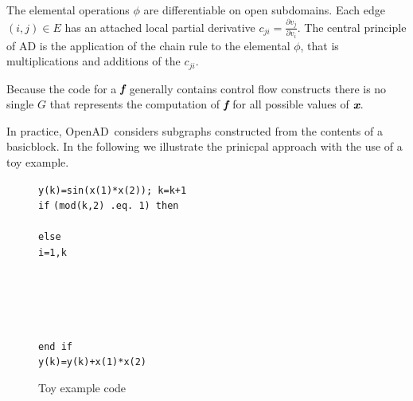 \documentclass[acmtocl,acmnow]{acmtrans2m}
\newcommand{\basicblock}{basicblock}
\newcommand{\OpenAD}{OpenAD}
\newcommand{\bmf}{\mbox{\bf\em f}}
\newcommand{\bmx}{\mbox{\bf\em x}}
\begin{document}
The elemental operations $\phi$ are differentiable on open subdomains. 
Each edge $(i,j)\in E$ has an attached local partial derivative 
$c_{ji}=\frac{\partial v_j}{\partial v_i}$. 
The central principle of AD is 
the application of the chain rule to the elemental $\phi$, that is 
multiplications and additions of the  $c_{ji}$.  

Because the code for a $\bmf$ generally contains control flow constructs there is no 
single $G$ that represents the computation of $\bmf$ for all possible values of $\bmx$.

In practice, \OpenAD\ considers subgraphs constructed 
from the contents of a \basicblock.
In the following we illustrate the prinicpal approach with the use 
of a toy example.  
\begin{figure}
\begin{tabbing}
\hspace{.6cm}{\footnotesize \bf 01}\hspace{.5cm} {\tt y(k)=sin(x(1)*x(2)); k=k+1} \\
\hspace{.6cm}{\footnotesize \bf 02}\hspace{.5cm} {\tt if} \={\tt (mod(k,2) .eq. 1) then } \\
\hspace{.6cm}{\footnotesize \bf 03}\hspace{.5cm}   \\
\hspace{.6cm}{\footnotesize \bf 04}\hspace{.5cm} {\tt else } \\
\hspace{.6cm}{\footnotesize \bf 05}\hspace{.5cm}  \={\tt i=1,k } \\
\hspace{.6cm}{\footnotesize \bf 06}\hspace{.5cm} \> \\
\hspace{.6cm}{\footnotesize \bf 07}\hspace{.5cm} \> \\
\hspace{.6cm}{\footnotesize \bf 08}\hspace{.5cm} \> \\
\hspace{.6cm}{\footnotesize \bf 09}\hspace{.5cm} \> \\
\hspace{.6cm}{\footnotesize \bf 10}\hspace{.5cm}  \\
\hspace{.6cm}{\footnotesize \bf 11}\hspace{.5cm} {\tt end if } \\
\hspace{.6cm}{\footnotesize \bf 12}\hspace{.5cm} {\tt y(k)=y(k)+x(1)*x(2) } 
\end{tabbing}
\caption{Toy example code}\label{fig:toy}
\end{figure}
\end{document}
